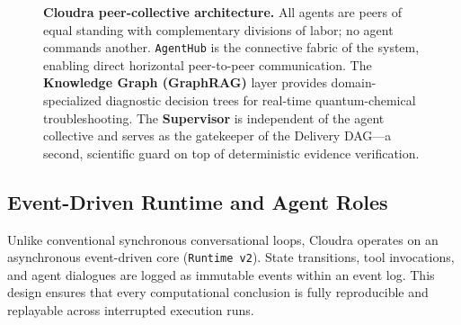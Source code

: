 \documentclass[10pt,twocolumn,letterpaper]{article}
\begin{document}
\begin{figure}[t]
\caption{\textbf{Cloudra peer-collective architecture.} All agents are peers of equal standing with complementary divisions of labor; no agent commands another. \texttt{AgentHub} is the connective fabric of the system, enabling direct horizontal peer-to-peer communication. The \textbf{Knowledge Graph (GraphRAG)} layer provides domain-specialized diagnostic decision trees for real-time quantum-chemical troubleshooting. The \textbf{Supervisor} is independent of the agent collective and serves as the gatekeeper of the Delivery DAG---a second, scientific guard on top of deterministic evidence verification.}
\label{fig:architecture}
\end{figure}

\subsection{Event-Driven Runtime and Agent Roles}
Unlike conventional synchronous conversational loops, Cloudra operates on an asynchronous event-driven core (\texttt{Runtime v2}). State transitions, tool invocations, and agent dialogues are logged as immutable events within an event log. This design ensures that every computational conclusion is fully reproducible and replayable across interrupted execution runs.
\end{document}
